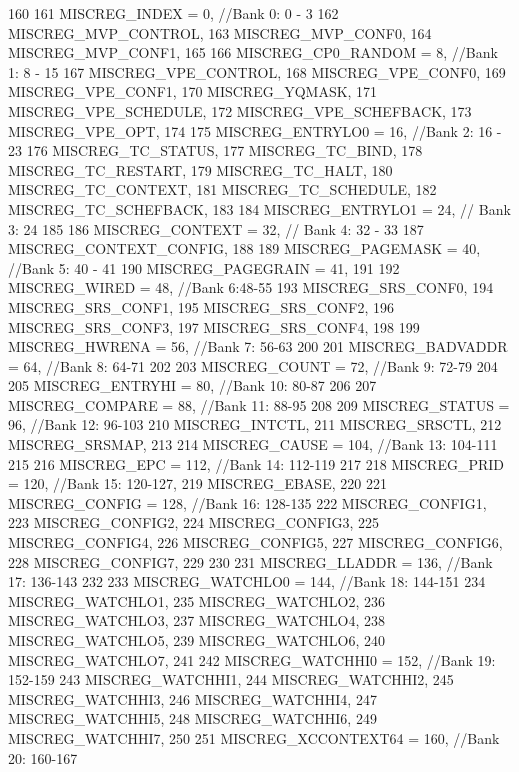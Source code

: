 \begin{DoxyCode}
160                  {
161     MISCREG_INDEX = 0,       //Bank 0: 0 - 3
162     MISCREG_MVP_CONTROL,
163     MISCREG_MVP_CONF0,
164     MISCREG_MVP_CONF1,
165 
166     MISCREG_CP0_RANDOM = 8,      //Bank 1: 8 - 15
167     MISCREG_VPE_CONTROL,
168     MISCREG_VPE_CONF0,
169     MISCREG_VPE_CONF1,
170     MISCREG_YQMASK,
171     MISCREG_VPE_SCHEDULE,
172     MISCREG_VPE_SCHEFBACK,
173     MISCREG_VPE_OPT,
174 
175     MISCREG_ENTRYLO0 = 16,   //Bank 2: 16 - 23
176     MISCREG_TC_STATUS,
177     MISCREG_TC_BIND,
178     MISCREG_TC_RESTART,
179     MISCREG_TC_HALT,
180     MISCREG_TC_CONTEXT,
181     MISCREG_TC_SCHEDULE,
182     MISCREG_TC_SCHEFBACK,
183 
184     MISCREG_ENTRYLO1 = 24,   // Bank 3: 24
185 
186     MISCREG_CONTEXT = 32,    // Bank 4: 32 - 33
187     MISCREG_CONTEXT_CONFIG,
188 
189     MISCREG_PAGEMASK = 40, //Bank 5: 40 - 41
190     MISCREG_PAGEGRAIN = 41,
191 
192     MISCREG_WIRED = 48,          //Bank 6:48-55
193     MISCREG_SRS_CONF0,
194     MISCREG_SRS_CONF1,
195     MISCREG_SRS_CONF2,
196     MISCREG_SRS_CONF3,
197     MISCREG_SRS_CONF4,
198 
199     MISCREG_HWRENA = 56,         //Bank 7: 56-63
200 
201     MISCREG_BADVADDR = 64,       //Bank 8: 64-71
202 
203     MISCREG_COUNT = 72,          //Bank 9: 72-79
204 
205     MISCREG_ENTRYHI = 80,        //Bank 10: 80-87
206 
207     MISCREG_COMPARE = 88,        //Bank 11: 88-95
208 
209     MISCREG_STATUS = 96,         //Bank 12: 96-103
210     MISCREG_INTCTL,
211     MISCREG_SRSCTL,
212     MISCREG_SRSMAP,
213 
214     MISCREG_CAUSE = 104,         //Bank 13: 104-111
215 
216     MISCREG_EPC = 112,           //Bank 14: 112-119
217 
218     MISCREG_PRID = 120,          //Bank 15: 120-127,
219     MISCREG_EBASE,
220 
221     MISCREG_CONFIG = 128,        //Bank 16: 128-135
222     MISCREG_CONFIG1,
223     MISCREG_CONFIG2,
224     MISCREG_CONFIG3,
225     MISCREG_CONFIG4,
226     MISCREG_CONFIG5,
227     MISCREG_CONFIG6,
228     MISCREG_CONFIG7,
229 
230 
231     MISCREG_LLADDR = 136,        //Bank 17: 136-143
232 
233     MISCREG_WATCHLO0 = 144,      //Bank 18: 144-151
234     MISCREG_WATCHLO1,
235     MISCREG_WATCHLO2,
236     MISCREG_WATCHLO3,
237     MISCREG_WATCHLO4,
238     MISCREG_WATCHLO5,
239     MISCREG_WATCHLO6,
240     MISCREG_WATCHLO7,
241 
242     MISCREG_WATCHHI0 = 152,     //Bank 19: 152-159
243     MISCREG_WATCHHI1,
244     MISCREG_WATCHHI2,
245     MISCREG_WATCHHI3,
246     MISCREG_WATCHHI4,
247     MISCREG_WATCHHI5,
248     MISCREG_WATCHHI6,
249     MISCREG_WATCHHI7,
250 
251     MISCREG_XCCONTEXT64 = 160, //Bank 20: 160-167
}
\end{DoxyCode}
